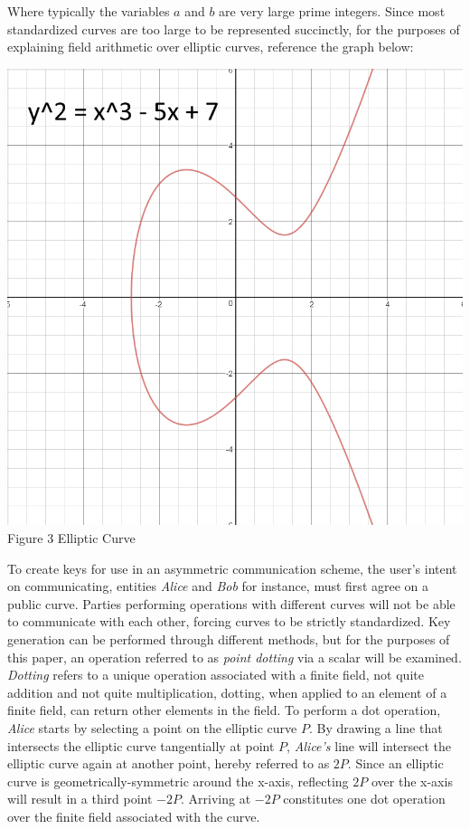 \documentclass[conference,compsoc]{IEEEtran}
\begin{document}
Where typically the variables $a$ and $b$ are very large prime integers. Since most standardized curves are too large to be represented succinctly, for the purposes of explaining field arithmetic over elliptic curves, reference the graph below:
\begin{center}
\includegraphics[scale = .385]{graph1.png}
\small {Figure 3 Elliptic Curve}
\break
\end{center}
To create keys for use in an asymmetric communication scheme, the user’s intent on communicating, entities \emph{Alice} and \emph{Bob} for instance, must first agree on a public curve. Parties performing operations with different curves will not be able to communicate with each other, forcing curves to be strictly standardized. Key generation can be performed through different methods, but for the purposes of this paper, an operation referred to as \emph{point dotting} via a scalar will be examined. \emph{Dotting} refers to a unique operation associated with a finite field, not quite addition and not quite multiplication, dotting, when applied to an element of a finite field, can return other elements in the field. To perform a dot operation, \emph{Alice} starts by selecting a point on the elliptic curve $P$. By drawing a line that intersects the elliptic curve tangentially at point $P$, \emph{Alice’s} line will intersect the elliptic curve again at another point, hereby referred to as $2P$. Since an elliptic curve is geometrically-symmetric around the x-axis, reflecting $2P$ over the x-axis will result in a third point $-2P$. Arriving at $-2P$ constitutes one dot operation over the finite field associated with the curve.
\end{document}
